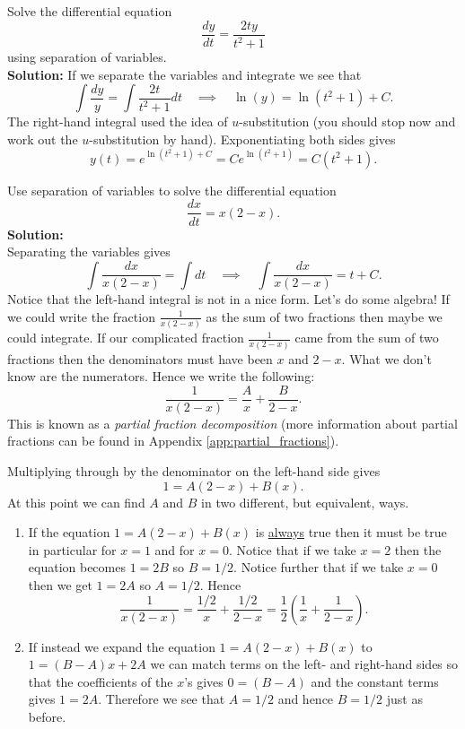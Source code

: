 \begin{example}
   Solve the differential equation 
   \[ \frac{dy}{dt} = \frac{2ty}{t^2+1} \]
   using separation of variables. \\{\bf Solution:}
   If we separate the variables and integrate we see that 
   \[ \int \frac{dy}{y} = \int \frac{2t}{t^2+1} dt \quad \implies \quad \ln(y) =
   \ln(t^2+1)+C. \]
   The right-hand integral used the idea of $u$-substitution (you should stop now and work
   out the $u$-substitution by hand).  Exponentiating both sides gives
   \[ y(t) = e^{\ln(t^2+1)+C} = Ce^{\ln(t^2+1)} = C(t^2+1). \]
\end{example}

\begin{example}
    Use separation of variables to solve the differential equation
    \[ \frac{dx}{dt} = x(2-x). \]
    {\bf Solution:} \\
    Separating the variables gives 
    \[ \int \frac{dx}{x(2-x)} = \int dt \quad \implies \quad \int \frac{dx}{x(2-x)} = t + C. \]
    Notice that the left-hand integral is not in a nice form.  Let's do some algebra!
    If we could write the fraction $\frac{1}{x(2-x)}$ as the sum of two fractions then
    maybe we could integrate.  If our complicated fraction $\frac{1}{x(2-x)}$ came from the
    sum of two fractions then the denominators must have been $x$ and $2-x$.  What we
    don't know are the numerators.  Hence we write the following:
    \[ \frac{1}{x(2-x)} = \frac{A}{x} + \frac{B}{2-x}. \]
    This is known as a {\it partial fraction decomposition} (more information about partial
    fractions can be found in Appendix \ref{app:partial_fractions}).

    Multiplying through by the denominator on the left-hand side gives
    \[ 1 = A(2-x) + B(x). \]
    At this point we can find $A$ and $B$ in two different, but equivalent, ways.
    \begin{enumerate}
        \item If the equation $1 = A(2-x) + B(x)$ is \underline{always} true then it must
            be true in particular for $x=1$ and for $x=0$.  Notice that if we take $x=2$ then the
            equation becomes $1 = 2B$ so $B = 1/2$.  Notice further that if we take $x=0$ then we get $1
            = 2A$ so $A = 1/2$.  Hence
            \[ \frac{1}{x(2-x)} = \frac{1/2}{x} + \frac{1/2}{2-x} = \frac{1}{2} \left(
            \frac{1}{x} + \frac{1}{2-x}  \right). \]
        \item If instead we expand the equation $1 = A(2-x) + B(x)$ to $1 = (B-A)x + 2A$
            we can match terms on the left- and right-hand sides so that the coefficients
            of the $x$'s gives $0 = (B-A)$ and the constant terms gives $1 = 2A$.
            Therefore we see that $A = 1/2$ and hence $B = 1/2$ just as before.
    \end{enumerate}


\end{example}
